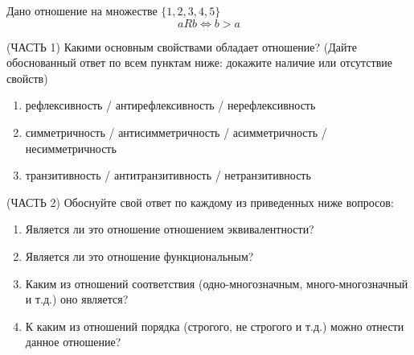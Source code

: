 \question
Дано отношение на множестве $\{1, 2, 3, 4, 5\}$ 
\begin{equation*}
	aRb \iff b > a
\end{equation*}

(ЧАСТЬ 1) Какими основным свойствами обладает отношение? (Дайте обоснованный ответ по всем пунктам ниже: докажите наличие или отсутствие свойств)  
\begin{enumerate}
	\renewcommand{\labelenumi}{\alph{enumi})}
	\item рефлексивность / антирефлексивность / нерефлексивность
	\item симметричность / антисимметричность / асимметричность / несимметричность
	\item транзитивность / антитранзитивность / нетранзитивность
\end{enumerate}

(ЧАСТЬ 2) Обоснуйте свой ответ по каждому из приведенных ниже вопросов:
\begin{enumerate}
	\renewcommand{\labelenumi}{\alph{enumi})}
    \item Является ли это отношение отношением эквивалентности?
    \item Является ли это отношение функциональным?
    \item Каким из отношений соответствия (одно-многозначным, много-многозначный и т.д.) оно является?
    \item К каким из отношений порядка (строгого, не строгого и т.д.) можно отнести данное отношение?
\end{enumerate}
